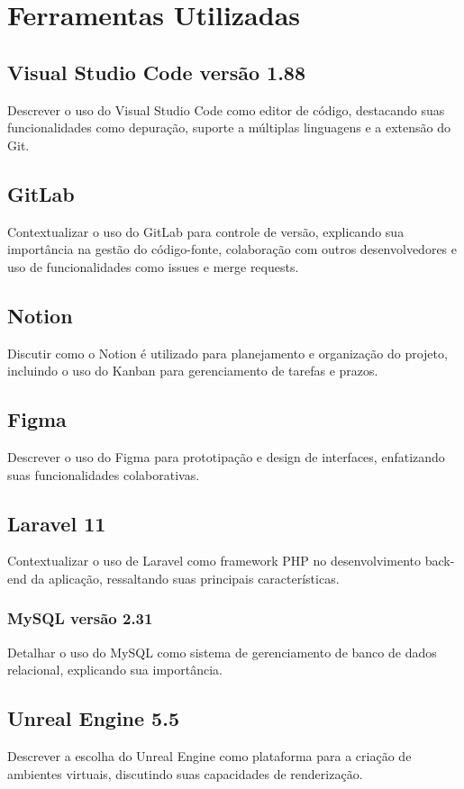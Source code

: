 \section{Ferramentas Utilizadas}
\subsection{Visual Studio Code versão 1.88}
Descrever o uso do Visual Studio Code como editor de código, destacando suas funcionalidades como depuração, suporte a múltiplas linguagens e a extensão do Git.

\subsection{GitLab}
Contextualizar o uso do GitLab para controle de versão, explicando sua importância na gestão do código-fonte, colaboração com outros desenvolvedores e uso de funcionalidades como issues e merge requests.

\subsection{Notion}
Discutir como o Notion é utilizado para planejamento e organização do projeto, incluindo o uso do Kanban para gerenciamento de tarefas e prazos.

\subsection{Figma}
Descrever o uso do Figma para prototipação e design de interfaces, enfatizando suas funcionalidades colaborativas.

\subsection{Laravel 11}
Contextualizar o uso de Laravel como framework PHP no desenvolvimento back-end da aplicação, ressaltando suas principais características.

\subsubsection{MySQL versão 2.31}
Detalhar o uso do MySQL como sistema de gerenciamento de banco de dados relacional, explicando sua importância.

\subsection{Unreal Engine 5.5}
Descrever a escolha do Unreal Engine como plataforma para a criação de ambientes virtuais, discutindo suas capacidades de renderização.

